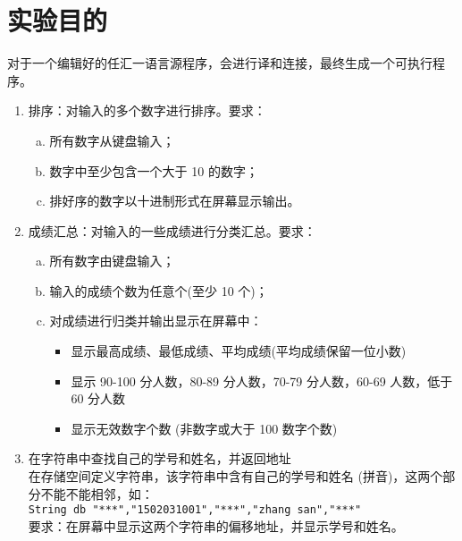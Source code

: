 \documentclass[12pt,AutoFakeBold]{article}
\begin{document}
\maketitle
\setcounter{tocdepth}{2}
\tableofcontents  %


\makeatletter
\begin{center}
    \LARGE \textbf{\textsf{\@problem}}
\end{center}
\makeatother



\section{实验目的}

对于一个编辑好的任汇一语言源程序，会进行译和连接，最终生成一个可执行程序。

\begin{enumerate}[(1)]
	\item 排序：对输入的多个数字进行排序。要求：
	\begin{enumerate}[(a)]
		\item 所有数字从键盘输入；
		\item 数字中至少包含一个大于 10 的数字；
		\item 排好序的数字以十进制形式在屏幕显示输出。
	\end{enumerate}
	\item 成绩汇总：对输入的一些成绩进行分类汇总。要求：
	\begin{enumerate}[(a)]
		\item 所有数字由键盘输入；
		\item 输入的成绩个数为任意个(至少 10 个)；
		\item 对成绩进行归类并输出显示在屏幕中：
		\begin{itemize}
			\item 显示最高成绩、最低成绩、平均成绩(平均成绩保留一位小数)
			\item 显示 90-100 分人数，80-89 分人数，70-79 分人数，60-69 人数，低于 60 分人数
			\item 显示无效数字个数 (非数字或大于 100 数字个数)
		\end{itemize}
	\end{enumerate}
	\item 在字符串中查找自己的学号和姓名，并返回地址\\
		在存储空间定义字符串，该字符串中含有自己的学号和姓名 (拼音)，这两个部分不能不能相邻，如：\\
		\lstinline[language={[x86masm]Assembler}]|String db "***","1502031001","***","zhang san","***"|\\
	要求：在屏幕中显示这两个字符串的偏移地址，并显示学号和姓名。
\end{enumerate}
\end{document}
